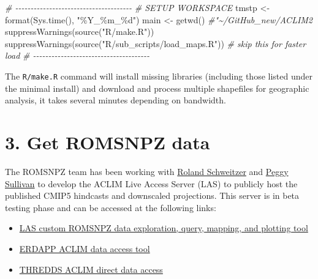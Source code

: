 \documentclass[
]{article}
\newenvironment{Shaded}{\begin{snugshade}}{\end{snugshade}}
\newcommand{\CommentTok}[1]{\textcolor[rgb]{0.56,0.35,0.01}{\textit{#1}}}
\newcommand{\FunctionTok}[1]{\textcolor[rgb]{0.00,0.00,0.00}{#1}}
\newcommand{\NormalTok}[1]{#1}
\newcommand{\OtherTok}[1]{\textcolor[rgb]{0.56,0.35,0.01}{#1}}
\newcommand{\StringTok}[1]{\textcolor[rgb]{0.31,0.60,0.02}{#1}}
\begin{document}
\begin{Shaded}
\begin{Highlighting}[]
    \CommentTok{\# {-}{-}{-}{-}{-}{-}{-}{-}{-}{-}{-}{-}{-}{-}{-}{-}{-}{-}{-}{-}{-}{-}{-}{-}{-}{-}{-}{-}{-}{-}{-}{-}{-}{-}{-}{-}{-}{-}}
    \CommentTok{\# SETUP WORKSPACE}
\NormalTok{    tmstp  }\OtherTok{\textless{}{-}} \FunctionTok{format}\NormalTok{(}\FunctionTok{Sys.time}\NormalTok{(), }\StringTok{"\%Y\_\%m\_\%d"}\NormalTok{)}
\NormalTok{    main   }\OtherTok{\textless{}{-}} \FunctionTok{getwd}\NormalTok{()  }\CommentTok{\#"\textasciitilde{}/GitHub\_new/ACLIM2}
    \FunctionTok{suppressWarnings}\NormalTok{(}\FunctionTok{source}\NormalTok{(}\StringTok{"R/make.R"}\NormalTok{))}
    \FunctionTok{suppressWarnings}\NormalTok{(}\FunctionTok{source}\NormalTok{(}\StringTok{"R/sub\_scripts/load\_maps.R"}\NormalTok{)) }\CommentTok{\# skip this for faster load}
    \CommentTok{\# {-}{-}{-}{-}{-}{-}{-}{-}{-}{-}{-}{-}{-}{-}{-}{-}{-}{-}{-}{-}{-}{-}{-}{-}{-}{-}{-}{-}{-}{-}{-}{-}{-}{-}{-}{-}{-}{-}}
\end{Highlighting}
\end{Shaded}

The \texttt{R/make.R} command will install missing libraries (including
those listed under the minimal install) and download and process
multiple shapefiles for geographic analysis, it takes several minutes
depending on bandwidth.

\hypertarget{get-romsnpz-data}{%
\section{3. Get ROMSNPZ data}\label{get-romsnpz-data}}

The ROMSNPZ team has been working with
\href{mailto:roland.schweitzer@noaa.gov}{Roland Schweitzer} and
\href{mailto:peggy.sullivan@noaa.gov}{Peggy Sullivan} to develop the
ACLIM Live Access Server (LAS) to publicly host the published CMIP5
hindcasts and downscaled projections. This server is in beta testing
phase and can be accessed at the following links:

\begin{itemize}
\item
  \href{https://data.pmel.noaa.gov/aclim/las/}{LAS custom ROMSNPZ data
  exploration, query, mapping, and plotting tool}
\item
  \href{https://data.pmel.noaa.gov/aclim/erddap/}{ERDAPP ACLIM data
  access tool}
\item
  \href{https://data.pmel.noaa.gov/aclim/thredds/}{THREDDS ACLIM direct
  data access}
\end{itemize}
\end{document}
